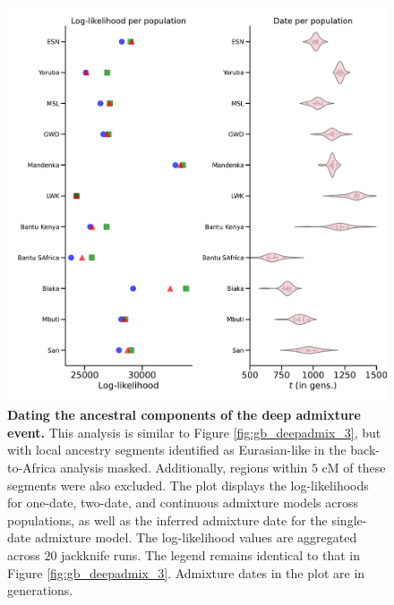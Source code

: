 \begin{figure}
    \centering
    \includegraphics[width=\textwidth]{figures/gb_deepadmix/deepadmix_filtered_strict_admixture_dates.pdf}
    \caption{\textbf{Dating the ancestral components of the deep admixture event.} This analysis is similar to Figure \ref{fig:gb_deepadmix_3}, but with local ancestry segments identified as Eurasian-like in the back-to-Africa analysis masked. Additionally, regions within $5$ cM of these segments were also excluded. The plot displays the log-likelihoods for one-date, two-date, and continuous admixture models across populations, as well as the inferred admixture date for the single-date admixture model. The log-likelihood values are aggregated across $20$ jackknife runs. The legend remains identical to that in Figure \ref{fig:gb_deepadmix_3}. Admixture dates in the plot are in generations. }
    \label{fig:gb_real_deep_dating_wobta}
\end{figure}

